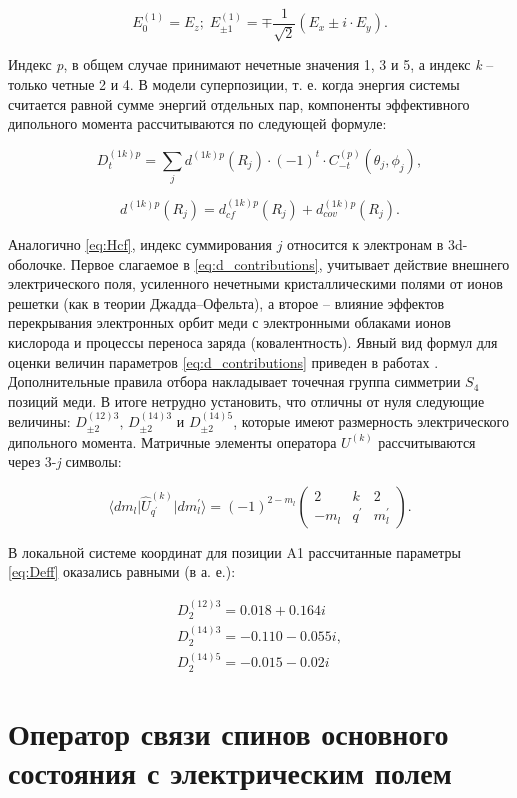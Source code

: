 \begin{equation}
	\label{eq:electricalComponents}
	E_{0}^{(1)} = E_z; \; E_{\pm 1}^{(1)} = \mp \frac{1}{\sqrt{2}} (E_x \pm i \cdot E_y).
\end{equation}

Индекс \textit{p}, в общем случае принимают нечетные значения 1, 3 и 5, а индекс \textit{k} – только четные 2 и 4. В модели суперпозиции, т. е. когда энергия системы считается равной сумме энергий отдельных пар, компоненты эффективного дипольного момента рассчитываются по следующей формуле:

\begin{equation}
	\label{eq:Deff}
	D^{(1k)p}_{t} = \sum_{j} d^{(1k)p}(R_j) \cdot (-1)^t \cdot C^{(p)}_{-t}(\theta_j,\phi_j),
\end{equation}

\begin{equation}
	\label{eq:d_contributions}
	d^{(1k)p}(R_j) = d^{(1k)p}_{cf}(R_j) + d^{(1k)p}_{cov}(R_j).
\end{equation}

Аналогично \cref{eq:Hcf}, индекс суммирования $j$ относится к электронам в 3d-оболочке. Первое слагаемое в \cref{eq:d_contributions}, учитывает действие внешнего электрического поля, усиленного нечетными кристаллическими полями от ионов решетки (как в теории Джадда--Офельта), а второе – влияние эффектов перекрывания электронных орбит меди с электронными облаками ионов кислорода и процессы переноса заряда (ковалентность). Явный вид формул для оценки величин параметров \cref{eq:d_contributions} приведен в работах \cite{Kornienko1977, Eremin2019jetp}.
Дополнительные правила отбора накладывает точечная группа симметрии $S_4$ позиций меди. В итоге нетрудно установить, что отличны от нуля следующие величины: $D_{\pm 2}^{(12)3}, \, D_{\pm 2}^{(14)3} \text{ и } D_{\pm 2}^{(14)5}$, которые имеют размерность электрического дипольного момента. Матричные элементы оператора $U^{(k)}$ рассчитываются через 3-\textit{j} символы:

\begin{equation}
	\label{eq:MatrixU}
	\langle dm_l \lvert \hat{U}_{q^\prime}^{(k)} \rvert dm_l^\prime \rangle = (-1)^{2-m_l} 
	\begin{pmatrix}
		2 & k & 2 \\
		-m_l & q^\prime & m_l^\prime
	\end{pmatrix}.
\end{equation}

В локальной системе координат для позиции A1 рассчитанные параметры \cref{eq:Deff} оказались равными (в а. е.):

\begin{equation}
	\label{eq:Dparams}
	\begin{array}{l}
		D_{2}^{(12) 3}=0.018+0.164 i \\
		D_{2}^{(14) 3}=-0.110-0.055 i, \\
		D_{2}^{(14) 5}=-0.015-0.02 i
	\end{array}
\end{equation}

\section{Оператор связи спинов основного состояния с электрическим полем}\label{sec:ch2/sec3}


\FloatBarrier
